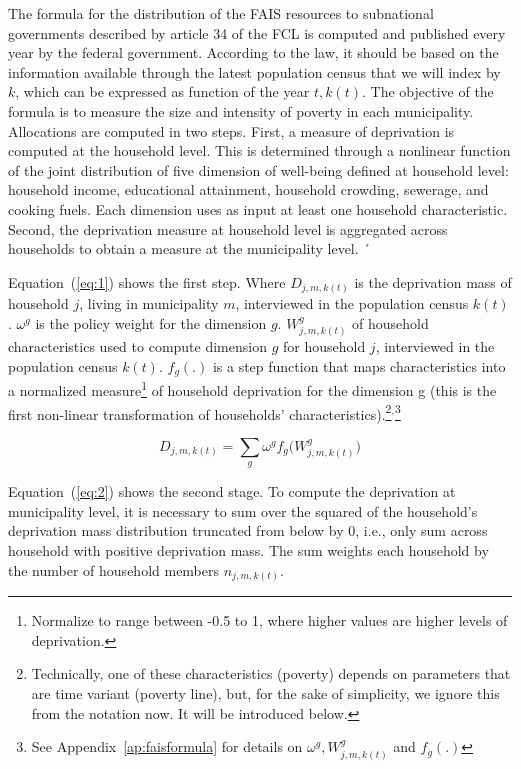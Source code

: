\documentclass[dv_diss_main.tex]{subfiles}
\begin{document}
The formula for the distribution of the FAIS resources to subnational governments described by article 34 of the FCL is computed and published every year by the federal government. According to the law, it should be based on the information available through the latest population census that we will index by $k$, which can be expressed as function of the year $t, k(t)$. The objective of the formula is to measure the size and intensity of poverty in each municipality. Allocations are computed in two steps. First, a measure of deprivation is computed at the household level. This is determined through a nonlinear function of the joint distribution of five dimension of well-being defined at household level: household income, educational attainment, household crowding, sewerage, and cooking fuels. Each dimension uses as input at least one household characteristic. Second, the deprivation measure at household level is aggregated across households to obtain a measure at the municipality level. ´

Equation~(\ref{eq:1}) shows the first step. Where $D_{j,m,k(t)}$ is the deprivation mass of household $j$, living in municipality $m$, interviewed in the population census $k(t)$. $\omega^g$ is the policy weight for the dimension $g$. $W_{j,m,k(t)}^g$ of household characteristics used to compute dimension $g$ for household $j$, interviewed in the population census $k(t)$. $f_g(.)$ is a step function that maps characteristics into a normalized measure\footnote{ Normalize to range between -0.5 to 1, where higher values are higher levels of deprivation.}  of household deprivation for the dimension g (this is the first non-linear transformation of households’ characteristics).\footnote{Technically, one of these characteristics (poverty) depends on parameters that are time variant (poverty line), but, for the sake of simplicity, we ignore this from the notation now. It will be introduced below.}$^{,}$\footnote{See Appendix~\ref{ap:faisformula} for details on $\omega^g,W_{j,m,k(t)}^{g}$ and $f_g (.)$}


\begin{equation}\label{eq:1}
D_{j,m,k(t)}=\sum_g \omega^g f_g \big(W_{j,m,k(t)}^{g}\big)   
\end{equation}


Equation~(\ref{eq:2}) shows the second stage. To compute the deprivation at municipality level, it is necessary to sum over the squared of the household’s deprivation mass distribution truncated from below by 0, i.e., only sum across household with positive deprivation mass. The sum weights each household by the number of household members $n_{j,m,k(t)}$. 
\end{document}
